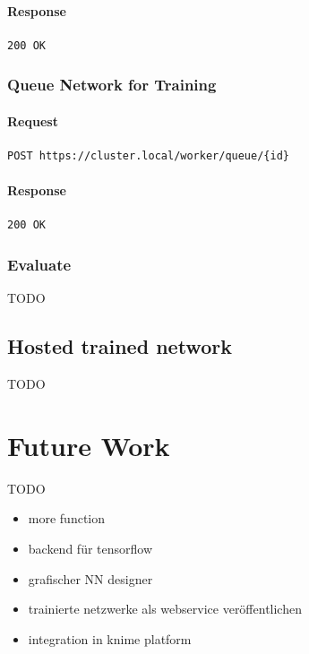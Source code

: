 \subsubsection{Response}\label{response-1}

\begin{verbatim}
200 OK
\end{verbatim}

\subsection{Queue Network for
Training}\label{queue-network-for-training}

\subsubsection{Request}\label{request-2}

\begin{verbatim}
POST https://cluster.local/worker/queue/{id}
\end{verbatim}

\subsubsection{Response}\label{response-2}

\begin{verbatim}
200 OK
\end{verbatim}

\subsection{Evaluate}\label{evaluate}

TODO

\section{Hosted trained network}\label{hosted-trained-network}

TODO

\chapter{Future Work}\label{future-work}

TODO

\begin{itemize}
\tightlist
\item
  more function\\
\item
  backend für tensorflow
\item
  grafischer NN designer
\item
  trainierte netzwerke als webservice veröffentlichen
\item
  integration in knime platform
\end{itemize}

